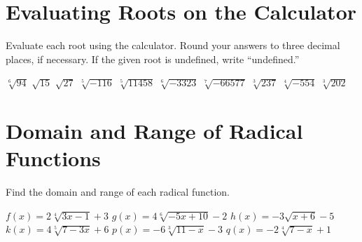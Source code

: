 \section*{Evaluating Roots on the Calculator}
Evaluate each root using the calculator. Round your answers to three decimal places, if necessary. If the given root is undefined, write ``undefined.''
\begin{smenum}
\mitemxxxxx
{$\sqrt[6]{94}$}
{$\sqrt{15}$}
{$\sqrt{27}$}
{$\sqrt[5]{-116}$}
{$\sqrt[5]{11458}$}
\mitemxxxxx
{$\sqrt[6]{-3323}$}
{$\sqrt[7]{-66577}$}
{$\sqrt[3]{237}$}
{$\sqrt[4]{-554}$}
{$\sqrt[3]{202}$}
\end{smenum}

\section*{Domain and Range of Radical Functions}
Find the domain and range of each radical function.
\begin{smenum}
\mitemxxx
{$f(x)=2\sqrt[4]{3x-1}+3$}
{$g(x)=4\sqrt[6]{-5x+10}-2$}
{$h(x)=-3\sqrt{x+6}-5$}
\mitemxxx
{$k(x)=4\sqrt[5]{7-3x}+6$}
{$p(x)=-6\sqrt[3]{11-x}-3$}
{$q(x)=-2\sqrt[4]{7-x}+1$}
\end{smenum}

